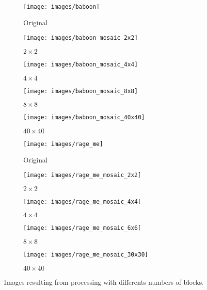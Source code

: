 \documentclass[journal]{IEEEtran}
\begin{document}
\begin{figure}
	
	\centering
	\begin{subfigure}{0.09\textwidth}
		\centering
		\texttt{[image: images/baboon]} 
		\caption{Original}
		\label{fig:mosaic:baboon}
	\end{subfigure}
	\centering
	\begin{subfigure}{0.09\textwidth}
		\centering
		\texttt{[image: images/baboon\_mosaic\_2x2]}
		\caption{$2\times 2$}
		\label{fig:mosaic:baboon_mosaic_2x2}
	\end{subfigure}
	\centering
	\begin{subfigure}{0.09\textwidth}
		\centering
		\texttt{[image: images/baboon\_mosaic\_4x4]}
		\caption{$4\times 4$}
		\label{fig:mosaic:baboon_mosaic_4x4}
	\end{subfigure}
	\centering
	\begin{subfigure}{0.09\textwidth}
		\centering
		\texttt{[image: images/baboon\_mosaic\_8x8]}
		\caption{$8\times 8$}
		\label{fig:mosaic:baboon_mosaic_8x8}
	\end{subfigure}
	\centering
	\begin{subfigure}{0.09\textwidth}
		\centering
		\texttt{[image: images/baboon\_mosaic\_40x40]}
		\caption{$40\times 40$}
		\label{fig:mosaic:baboon_mosaic_40x40}
	\end{subfigure}

	\centering
	\begin{subfigure}{0.09\textwidth}
		\centering
		\texttt{[image: images/rage\_me]} 
		\caption{Original}
		\label{fig:mosaic:rage_me}
	\end{subfigure}
	\centering
	\begin{subfigure}{0.09\textwidth}
		\centering
		\texttt{[image: images/rage\_me\_mosaic\_2x2]}
		\caption{$2\times 2$}
		\label{fig:mosaic:rage_me_2x2}
	\end{subfigure}
	\centering
	\begin{subfigure}{0.09\textwidth}
		\centering
		\texttt{[image: images/rage\_me\_mosaic\_4x4]}
		\caption{$4\times 4$}
		\label{fig:mosaic:rage_me_4x4}
	\end{subfigure}
	\centering
	\begin{subfigure}{0.09\textwidth}
		\centering
		\texttt{[image: images/rage\_me\_mosaic\_6x6]}
		\caption{$8\times 8$}
		\label{fig:mosaic:rage_me_8x8}
	\end{subfigure}
	\centering
	\begin{subfigure}{0.09\textwidth}
		\centering
		\texttt{[image: images/rage\_me\_mosaic\_30x30]}
		\caption{$40\times 40$}
		\label{fig:mosaic:rage_me_40x40}
	\end{subfigure}

	\caption{Images resulting from processing with differents numbers of blocks.}
	\label{fig:mosaic:results}
\end{figure}
\end{document}
